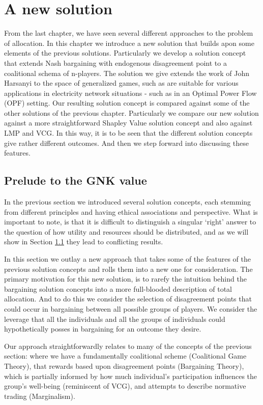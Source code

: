 \chapter{A new solution}
\label{cha:new_solution}

From the last chapter, we have seen several different approaches to the problem of allocation.
In this chapter we introduce a new solution that builds apon some elements of the previous solutions.
Particularly we develop a solution concept that extends Nash bargaining with endogenous disagreement point to a coalitional schema of n-players.
The solution we give extends the work of John Harsanyi to the space of generalized games, such as are suitable for various applications in electricity network situations - such as in an Optimal Power Flow (OPF) setting.
Our resulting solution concept is compared against some of the other solutions of the previous chapter. Particularly we compare our new solution against a more straightforward Shapley Value solution concept and also against LMP and VCG.
In this way, it is to be seen that the different solution concepts give rather different outcomes.
And then we step forward into discussing these features.


\section{Prelude to the GNK value}

In the previous section we introduced several solution concepts, each stemming from different principles and having ethical associations and perspective.
What is important to note, is that it is difficult to distinguish a singular `right' answer to the question of how utility and resources should be distributed, and as we will show in Section \ref{} they lead to conflicting results.

In this section we outlay a new approach that takes some of the features of the previous solution concepts and rolls them into a new one for consideration.
The primary motivation for this new solution, is to rarefy the intuition behind the bargaining solution concepts into a more full-blooded description of total allocation.
And to do this we consider the selection of disagreement points that could occur in bargaining between all possible groups of players.
We consider the leverage that all the individuals and all the groups of individuals could hypothetically posses in bargaining for an outcome they desire.

Our approach straightforwardly relates to many of the concepts of the previous section: where we have a fundamentally coalitional scheme (Coalitional Game Theory), that rewards based upon disagreement points (Bargaining Theory), which is partially informed by how much individual's participation influences the group's well-being (reminiscent of VCG), and attempts to describe normative trading (Marginalism).

